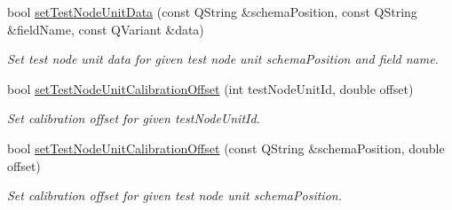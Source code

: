 \begin{DoxyCompactItemize}
bool \hyperlink{classmdt_tt_abstract_test_node_calibration_tool_a07f66a52481291172896b8bb6bf7d233}{set\-Test\-Node\-Unit\-Data} (const Q\-String \&schema\-Position, const Q\-String \&field\-Name, const Q\-Variant \&data)
\begin{DoxyCompactList}\small\item\em Set test node unit data for given test node unit schema\-Position and field name. \end{DoxyCompactList}\item 
bool \hyperlink{classmdt_tt_abstract_test_node_calibration_tool_a8b99adc8b660a48f8b86f82939cbe918}{set\-Test\-Node\-Unit\-Calibration\-Offset} (int test\-Node\-Unit\-Id, double offset)
\begin{DoxyCompactList}\small\item\em Set calibration offset for given test\-Node\-Unit\-Id. \end{DoxyCompactList}\item 
bool \hyperlink{classmdt_tt_abstract_test_node_calibration_tool_a3182718cb99cb4b7bac06c34688a7344}{set\-Test\-Node\-Unit\-Calibration\-Offset} (const Q\-String \&schema\-Position, double offset)
\begin{DoxyCompactList}\small\item\em Set calibration offset for given test node unit schema\-Position. \end{DoxyCompactList}\end{DoxyCompactItemize}
